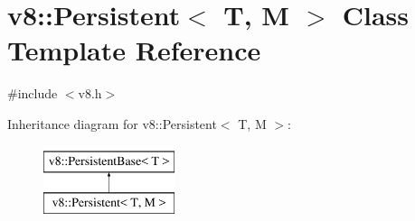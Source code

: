 \hypertarget{classv8_1_1Persistent}{\section{v8\-:\-:Persistent$<$ T, M $>$ Class Template Reference}
\label{classv8_1_1Persistent}
}


{\ttfamily \#include $<$v8.\-h$>$}

Inheritance diagram for v8\-:\-:Persistent$<$ T, M $>$\-:\begin{figure}[H]
\begin{center}
\leavevmode
\includegraphics[height=2.000000cm]{classv8_1_1Persistent}
\end{center}
\end{figure}
